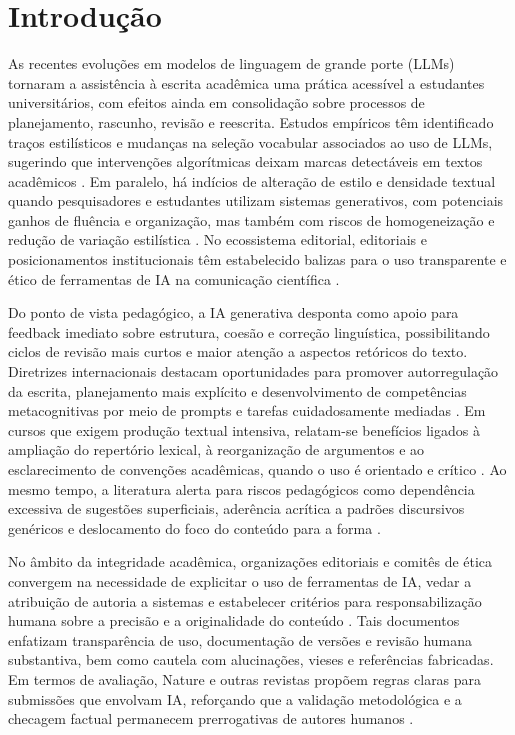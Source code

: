 \section{Introdução}\label{sec:introducao}

As recentes evoluções em modelos de linguagem de grande porte (LLMs) tornaram a assistência à escrita acadêmica uma prática acessível a estudantes universitários, com efeitos ainda em consolidação sobre processos de planejamento, rascunho, revisão e reescrita. Estudos empíricos têm identificado traços estilísticos e mudanças na seleção vocabular associados ao uso de LLMs, sugerindo que intervenções algorítmicas deixam marcas detectáveis em textos acadêmicos \cite{kobak2025llm}. Em paralelo, há indícios de alteração de estilo e densidade textual quando pesquisadores e estudantes utilizam sistemas generativos, com potenciais ganhos de fluência e organização, mas também com riscos de homogeneização e redução de variação estilística \cite{geng2024style,yeadon2024ai}. No ecossistema editorial, editoriais e posicionamentos institucionais têm estabelecido balizas para o uso transparente e ético de ferramentas de IA na comunicação científica \cite{thorp2023notauthor,nature2023groundrules,cope2023ai,wame2023recs,icmje2023ai}.

Do ponto de vista pedagógico, a IA generativa desponta como apoio para feedback imediato sobre estrutura, coesão e correção linguística, possibilitando ciclos de revisão mais curtos e maior atenção a aspectos retóricos do texto. Diretrizes internacionais destacam oportunidades para promover autorregulação da escrita, planejamento mais explícito e desenvolvimento de competências metacognitivas por meio de prompts e tarefas cuidadosamente mediadas \cite{unesco2023diretrizes,educause2023gai}. Em cursos que exigem produção textual intensiva, relatam-se benefícios ligados à ampliação do repertório lexical, à reorganização de argumentos e ao esclarecimento de convenções acadêmicas, quando o uso é orientado e crítico \cite{yeadon2024ai}. Ao mesmo tempo, a literatura alerta para riscos pedagógicos como dependência excessiva de sugestões superficiais, aderência acrítica a padrões discursivos genéricos e deslocamento do foco do conteúdo para a forma \cite{geng2024style}.

No âmbito da integridade acadêmica, organizações editoriais e comitês de ética convergem na necessidade de explicitar o uso de ferramentas de IA, vedar a atribuição de autoria a sistemas e estabelecer critérios para responsabilização humana sobre a precisão e a originalidade do conteúdo \cite{cope2023ai,wame2023recs,icmje2023ai,thorp2023notauthor}. Tais documentos enfatizam transparência de uso, documentação de versões e revisão humana substantiva, bem como cautela com alucinações, vieses e referências fabricadas. Em termos de avaliação, Nature e outras revistas propõem regras claras para submissões que envolvam IA, reforçando que a validação metodológica e a checagem factual permanecem prerrogativas de autores humanos \cite{nature2023groundrules}.

